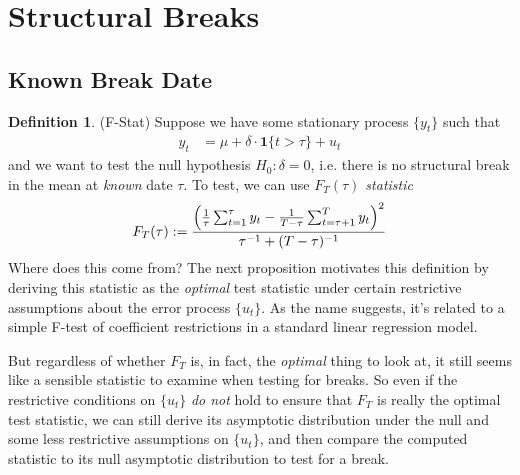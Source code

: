 \documentclass[12pt]{article}
\theoremstyle{plain}
\theoremstyle{definition}
\newtheorem{defn}[thm]{Definition}
\theoremstyle{remark}
\begin{document}
\clearpage
\section{Structural Breaks}

\subsection{Known Break Date}


\begin{defn}(F-Stat)
\label{defn:Fchow}
Suppose we have some stationary process $\{y_t\}$ such that
\begin{align}
  y_t
  &= \mu + \delta \cdot \mathbf{1}\{t>\tau\} + u_t
  \label{Fchowy}
\end{align}
and we want to test the null hypothesis $H_0:\delta=0$, i.e. there is no
structural break in the mean at \emph{known} date $\tau$.  To test,
we can use
\emph{$F_T(\tau)$ statistic}
\begin{align}
  F_T(\tau)
  :=
  \frac{%
  \left(
  \frac{1}{\tau}\sum_{t=1}^\tau y_t
  -
  \frac{1}{T-\tau}\sum_{t=\tau+1}^T y_t
  \right)^2
  }{\tau^{-1} + (T-\tau)^{-1}}
  \label{Fchow}
\end{align}
Where does this come from?
The next proposition motivates this definition by deriving this
statistic as the \emph{optimal} test statistic under certain restrictive
assumptions about the error process $\{u_t\}$.
As the name suggests, it's related to a simple F-test of coefficient
restrictions in a standard linear regression model.

But regardless of whether $F_T$ is, in fact, the \emph{optimal} thing to
look at, it still seems like a sensible statistic to examine when
testing for breaks.
So even if the restrictive conditions on $\{u_t\}$ \emph{do not} hold to
ensure that $F_T$ is really the optimal test statistic, we can still
derive its asymptotic distribution under the null and some less
restrictive assumptions on $\{u_t\}$, and then compare the computed
statistic to its null asymptotic distribution to test for a break.
\end{defn}
\end{document}
